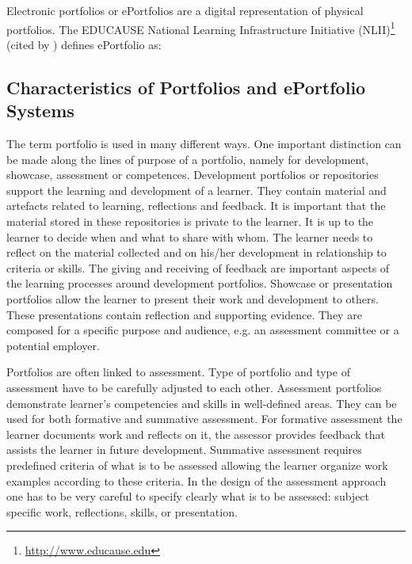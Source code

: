 Electronic portfolios or ePortfolios are a digital representation of physical
portfolios. The EDUCAUSE National Learning Infrastructure Initiative
(NLII)\footnote{\url{http://www.educause.edu}} (cited by
\citealp{IMSGlobalLearningConsortium2005}) defines ePortfolio as:


\subsection{Characteristics of Portfolios and ePortfolio Systems}
The term portfolio is used in many different ways. One important distinction can
be made along the lines of purpose of a portfolio, namely for development,
showcase, assessment or competences. Development portfolios or repositories
support the learning and development of a learner. They contain material and
artefacts related to learning, reflections and feedback. It is important that
the material stored in these repositories is private to the learner. It is up to
the learner to decide when and what to share with whom. The learner needs to
reflect on the material collected and on his/her development in relationship to
criteria or skills. The giving and receiving of feedback are important aspects
of the learning processes around development portfolios. Showcase or
presentation portfolios allow the learner to present their work and development
to others. These presentations contain reflection and supporting evidence. They
are composed for a specific purpose and audience, e.g. an assessment committee
or a potential employer.

Portfolios are often linked to assessment. Type of portfolio and type of
assessment have to be carefully adjusted to each other. Assessment portfolios
demonstrate learner's competencies and skills in well-defined areas. They can be
used for both formative and summative assessment. For formative assessment the
learner documents work and reflects on it, the assessor provides feedback that
assists the learner in future development. Summative assessment requires
predefined criteria of what is to be assessed allowing the learner organize work
examples according to these criteria. In the design of the assessment approach
one has to be very careful to specify clearly what is to be assessed: subject
specific work, reflections, \LLLs skills, or presentation.

